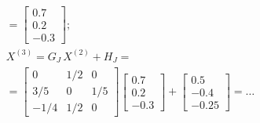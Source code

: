 \documentclass[CN_A-Tests_Resolutions.tex]{subfiles}
\begin{document}
\begin{questionBox}
\begin{gather}
    =\begin{bmatrix}
      0.7\\0.2\\-0.3
    \end{bmatrix}
    ; \\[1ex]
    X^{(3)}
    =G_J\,X^{(2)}+H_J
    = \\
    =\begin{bmatrix}
      0 & 1/2 & 0
      \\ 3/5 & 0 & 1/5
      \\ -1/4 & 1/2 & 0
    \end{bmatrix}
    \begin{bmatrix}
      0.7\\0.2\\-0.3
    \end{bmatrix}
    + \begin{bmatrix}
      0.5\\-0.4\\-0.25
    \end{bmatrix}
    =\dots
  \end{gather}

\end{questionBox}
\end{document}
